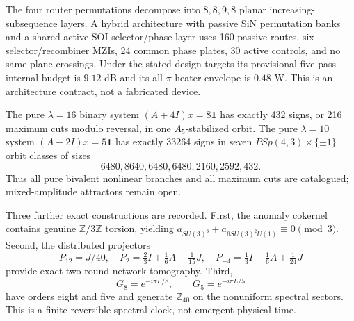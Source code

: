 The four router permutations decompose into $8,8,9,8$ planar increasing-subsequence layers.  A hybrid architecture with passive SiN permutation banks and a shared active SOI selector/phase layer uses 160 passive routes, six selector/recombiner MZIs, 24 common phase plates, 30 active controls, and no same-plane crossings.  Under the stated design targets its provisional five-pass internal budget is $9.12$ dB and its all-$\pi$ heater envelope is $0.48$ W.  This is an architecture contract, not a fabricated device.

The pure $\lambda=16$ binary system $(A+4I)x=8\mathbf1$ has exactly 432 signs, or 216 maximum cuts modulo reversal, in one $A_5$-stabilized orbit.  The pure $\lambda=10$ system $(A-2I)x=5\mathbf1$ has exactly 33264 signs in seven $PSp(4,3)\times\{\pm1\}$ orbit classes of sizes
\[
6480,8640,6480,6480,2160,2592,432.
\]
Thus all pure bivalent nonlinear branches and all maximum cuts are catalogued; mixed-amplitude attractors remain open.

Three further exact constructions are recorded.  First, the anomaly cokernel contains genuine $\mathbb Z/3\mathbb Z$ torsion, yielding $a_{SU(3)^3}+a_{6SU(3)^2U(1)}\equiv0\pmod3$.  Second, the distributed projectors
\[
P_{12}=J/40,\quad P_2=\tfrac23I+\tfrac16A-\tfrac1{15}J,\quad P_{-4}=\tfrac13I-\tfrac16A+\tfrac1{24}J
\]
provide exact two-round network tomography.  Third,
\[
G_8=e^{-i\pi L/8},\qquad G_5=e^{-i\pi L/5}
\]
have orders eight and five and generate $\mathbb Z_{40}$ on the nonuniform spectral sectors.  This is a finite reversible spectral clock, not emergent physical time.
